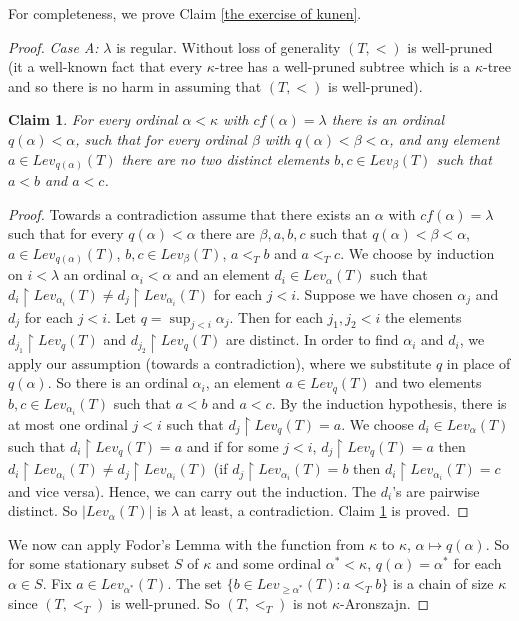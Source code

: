 \documentclass[11pt]{amsart}
\theoremstyle{plain}
\newtheorem{claim}[theorem]{Claim}
\theoremstyle{definition} %
\theoremstyle{remark}
\begin{document}
For completeness, we prove Claim \ref{the exercise of kunen}.
\begin{proof}
\emph{Case A:} $\lambda$ is regular. Without loss of generality $(T,<)$ is well-pruned
(it a well-known fact that every $\kappa$-tree has a well-pruned subtree which is a $\kappa$-tree and so there is no harm in assuming that $(T,<)$ is well-pruned).


\begin{claim}\label{argue}
For every ordinal $\alpha<\kappa$ with $cf(\alpha)=\lambda$ there is an ordinal $q(\alpha)<\alpha$, such that for every ordinal $\beta$ with $q(\alpha)<\beta<\alpha$, and any element $a \in Lev_{q(\alpha)}(T)$ there are no two distinct elements $b,c \in Lev_\beta(T)$ such that $a<b$ and $a<c$.
\end{claim}

\begin{proof}
Towards a contradiction assume that there exists an $\alpha$ with $cf(\alpha)=\lambda$ such that for every $q(\alpha)<\alpha$ there are $\beta,a,b,c$ such that $q(\alpha)<\beta<\alpha$, $a \in Lev_{q(\alpha)}(T)$, $b,c \in Lev_\beta(T)$, $a<_T b$ and $a <_T c$. We choose by induction on $i<\lambda$ an ordinal $\alpha_i<\alpha$ and an element $d_i \in Lev_\alpha(T)$ such that $d_i \restriction Lev_{\alpha_{i}}(T) \neq d_j \restriction Lev_{\alpha_{i}}(T)$ for each $j<i$. Suppose we have chosen $\alpha_j$ and $d_j$ for each $j<i$. Let $q=\sup_{j<i}\alpha_j$. Then for each $j_1,j_2<i$ the elements $d_{j_1} \restriction Lev_q(T)$ and $d_{j_2} \restriction Lev_q(T)$ are distinct. In order to find $\alpha_{i}$ and $d_i$, we apply our assumption (towards a contradiction), where we substitute $q$ in place of $q(\alpha)$. So there is an ordinal $\alpha_{i}$, an element $a \in Lev_{q}(T)$ and two elements $b,c \in Lev_{\alpha_{i}}(T)$ such that $a<b$ and $a<c$. By the induction hypothesis, there is at most one ordinal $j<i$ such that $d_j \restriction Lev_{q}(T)=a$. We choose $d_i \in Lev_{\alpha}(T)$ such that $d_i \restriction Lev_{q}(T)=a$ and if for some $j<i$, $d_j \restriction Lev_{q}(T)=a$ then $d_i \restriction Lev_{\alpha_{i}}(T) \neq d_j \restriction Lev_{\alpha_{i}}(T)$ (if $d_j \restriction Lev_{\alpha_{i}}(T)=b$ then $d_i \restriction Lev_{\alpha_{i}}(T)=c$ and vice versa). Hence, we can carry out the induction. The $d_i$'s are pairwise distinct. So $|Lev_\alpha(T)|$ is $\lambda$ at least, a contradiction. Claim \ref{argue} is proved.
\end{proof}


We now can apply Fodor's Lemma with the function from $\kappa$ to $\kappa$, $\alpha \mapsto q(\alpha)$. So for some stationary subset $S$ of $\kappa$ and some ordinal $\alpha^*<\kappa$, $q(\alpha)=\alpha^*$ for each $\alpha \in S$. Fix $a \in Lev_{\alpha^*}(T)$. The set $\{b \in Lev_{\geq \alpha^*}(T):a<_Tb\}$ is a chain of size $\kappa$ since $(T,<_T)$ is well-pruned. So $(T,<_T)$ is not $\kappa$-Aronszajn.


\end{proof}
\end{document}
